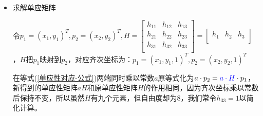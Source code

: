 \documentclass{article}
\begin{document}
\begin{itemize}
	\item 求解单应矩阵
	\begin{tcolorbox}
		[colback = Emerald!10, colframe = cyan!40!black, title = (1)化为齐次坐标]
		令$p_1=\left( x_1,y_1 \right) ^T,p_2=\left( x_2,y_2 \right) ^T,H=\left[ \begin{matrix}
			h_{11}&		h_{12}&		h_{13}\\
			h_{21}&		h_{22}&		h_{23}\\
			h_{31}&		h_{32}&		h_{33}\\
		\end{matrix} \right] =\left[ \begin{matrix}
			h_1&		h_2&		h_3\\
		\end{matrix} \right]  $，$H$把$p_1$映射到$p_2$，对应齐次坐标为：$p_1=\left( x_1,y_1,1 \right) ^T,p_2=\left( x_2,y_2,1 \right) ^T$
	\end{tcolorbox}
	
	\begin{tcolorbox}
		[colback = Emerald!10, colframe = cyan!40!black, title = (2)单应性矩阵的自由度]
		在等式(\ref{单应性对应-公式})两端同时乘以常数$a$原等式化为$a\cdot p_2={\color{blue} a\cdot H}\cdot p_1$，新得到的单应性矩阵$aH$和原单应性矩阵$H$的作用相同，因为齐次坐标乘以常数后保持不变，所以虽然$H$有九个元素，但自由度却为8，我们常令$h_{33}=1$以简化计算。
	\end{tcolorbox}
	

\end{itemize}
\end{document}
